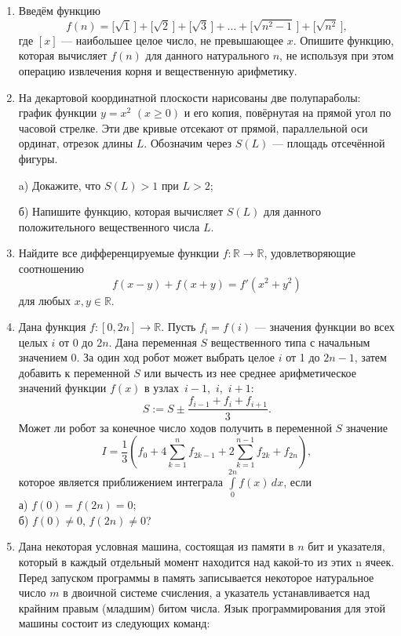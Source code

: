 \begin{enumerate}
\item Введём функцию
$$
f(n) = \bigl[\sqrt 1\,\bigr] + \bigl[\sqrt 2\,\bigr] + \bigl[\sqrt 3\,\bigr] + \hdots + \bigl[\sqrt{n^2-1}\,\bigr] + \bigl[\sqrt{n^2}\,\bigr],
$$
где $[x]$ --- наибольшее целое число, не превышающее $x$. Опишите функцию, которая вычисляет $f(n)$ для данного натурального $n$, не используя при этом операцию извлечения корня и вещественную арифметику.

\item На декартовой координатной плоскости нарисованы две полупараболы: график функции $y = x^2$ $(x \geqslant 0)$ и его копия, повёрнутая на прямой угол по часовой стрелке. Эти две кривые отсекают от прямой, параллельной оси ординат, отрезок длины $L$. Обозначим через $S(L)$ --- площадь отсечённой фигуры.

a) Докажите, что $S(L) > 1$ при $L > 2$;

б) Напишите функцию, которая вычисляет $S(L)$ для данного положительного вещественного числа $L$.



\item Найдите все дифференцируемые функции $f\colon \mathbb R\rightarrow\mathbb R$, удовлетворяющие соотношению
$$
f(x-y) + f(x+y) = f'(x^2 + y^2)
$$
для любых $x,y\in\mathbb R$.



\item  Дана функция $f\colon [0, 2n]\rightarrow\mathbb R$. Пусть $f_i = f(i)$ --- значения функции во всех целых $i$ от 0 до $2n$. Дана переменная $S$ вещественного типа с начальным значением 0. За один ход робот может выбрать целое $i$ от 1 до $2n-1$, затем добавить к переменной $S$ или вычесть из нее среднее арифметическое значений функции $f(x)$ в узлах~$i-1$,~$i$,~$i+1$:
$$S := S \pm \frac{f_{i-1}+f_i+f_{i+1}}{3}.$$ 
Может ли робот за конечное число ходов получить в переменной $S$ значение
$$I = \frac{1}{3} \left(f_0 + 4\sum\limits_{k=1}^{n}{f_{2k-1}} + 2\sum\limits_{k=1}^{n-1}{f_{2k}} + f_{2n}\right),$$
которое является приближением интеграла $\displaystyle \int\limits_0^{2n} f(x)\,dx$, если\\
а) $f(0) = f(2n) = 0$;\\
б) $f(0) \ne 0$, $f(2n) \ne 0$?

\item  Дана некоторая условная машина, состоящая из памяти в $n$ бит и указателя, который в каждый отдельный момент находится над какой-то из этих n ячеек. Перед запуском программы в память записывается некоторое натуральное число $m$ в двоичной системе счисления, а указатель устанавливается над крайним правым (младшим) битом числа. Язык программирования для этой машины состоит из следующих команд:


\end{enumerate}
